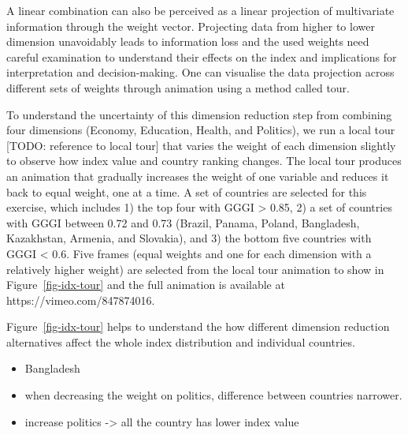 \documentclass[
]{interact}
\providecommand{\tightlist}{%
  \setlength{\itemsep}{0pt}\setlength{\parskip}{0pt}}\usepackage{longtable,booktabs,array}
\begin{document}
A linear combination can also be perceived as a linear projection of
multivariate information through the weight vector. Projecting data from
higher to lower dimension unavoidably leads to information loss and the
used weights need careful examination to understand their effects on the
index and implications for interpretation and decision-making. One can
visualise the data projection across different sets of weights through
animation using a method called tour.

To understand the uncertainty of this dimension reduction step from
combining four dimensions (Economy, Education, Health, and Politics), we
run a local tour {[}TODO: reference to local tour{]} that varies the
weight of each dimension slightly to observe how index value and country
ranking changes. The local tour produces an animation that gradually
increases the weight of one variable and reduces it back to equal
weight, one at a time. A set of countries are selected for this
exercise, which includes 1) the top four with GGGI \textgreater{} 0.85,
2) a set of countries with GGGI between 0.72 and 0.73 (Brazil, Panama,
Poland, Bangladesh, Kazakhstan, Armenia, and Slovakia), and 3) the
bottom five countries with GGGI \textless{} 0.6. Five frames (equal
weights and one for each dimension with a relatively higher weight) are
selected from the local tour animation to show in
Figure~\ref{fig-idx-tour} and the full animation is available at
https://vimeo.com/847874016.

Figure~\ref{fig-idx-tour} helps to understand the how different
dimension reduction alternatives affect the whole index distribution and
individual countries.

\begin{itemize}
\tightlist
\item
  Bangladesh
\item
  when decreasing the weight on politics, difference between countries
  narrower.
\item
  increase politics -\textgreater{} all the country has lower index
  value
\end{itemize}
\end{document}
